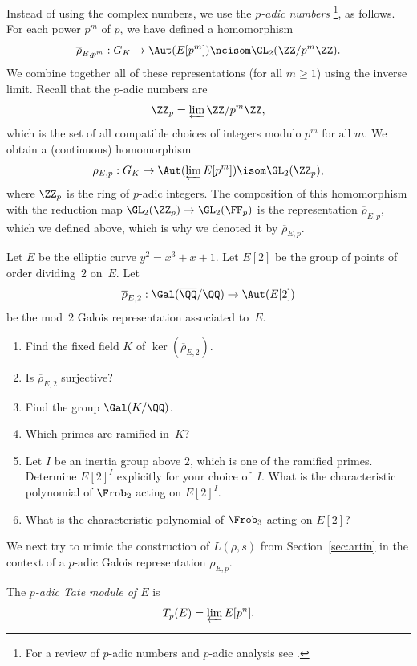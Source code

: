 Instead of using the complex numbers, we use the \emph{$p$-adic numbers}
\footnote{
  For a review of $p$-adic numbers and $p$-adic analysis
  see \cite{koblitz1996p}.
}, as follows. For each power $p^m$ of $p$, we have defined a homomorphism
\[
  \overline{\rho}_{E,p^m}: G_K \to \Aut(E[p^m]) \ncisom \GL_2(\ZZ/p^m\ZZ).
\]
We combine together all of these representations (for all $m\geq 1$)
using the inverse limit.
Recall that the $p$-adic numbers are
\[
  \ZZ_p = \varprojlim \ZZ/p^m\ZZ,
\]
which is the set of all compatible choices of integers modulo $p^m$ for
all $m$.
We obtain a (continuous) homomorphism
\[
  \rho_{E,p}: G_K \to \Aut(\varprojlim E[p^m]) \isom \GL_2(\ZZ_p),
\]
where $\ZZ_p$ is the ring of $p$-adic integers.  The composition of
this homomorphism with the reduction map $\GL_2(\ZZ_p) \to \GL_2(\FF_p)$
is the representation $\overline{\rho}_{E,p}$, which we defined above, which
is why we denoted it by $\overline{\rho}_{E,p}$.

\begin{exercise}
  Let $E$ be the elliptic curve $y^2=x^3+x+1$.  Let 
  $E[2]$  be the group of points of order dividing~$2$ on~$E$.  Let 
  \[
    \overline{\rho}_{E,2}:\Gal(\overline{\QQ}/\QQ) \to \Aut(E[2])
  \]
  be the mod~$2$ Galois representation associated to~$E$.
  \begin{enumerate}
    \item Find the fixed field $K$ of $\ker(\overline{\rho}_{E,2})$.
    \item Is $\overline{\rho}_{E,2}$ surjective?
    \item Find the group $\Gal(K/\QQ)$.
    \item Which primes are ramified in~$K$?
    \item Let $I$ be an inertia group above $2$, which is one of the ramified 
    primes. Determine $E[2]^I$ explicitly for your choice of~$I$. What is the
    characteristic polynomial of $\Frob_2$ acting on $E[2]^I$.
    \item What is the characteristic polynomial of $\Frob_3$ acting
    on $E[2]$?
  \end{enumerate}
\end{exercise}

We next try to mimic the construction of $L(\rho,s)$ from
Section~\ref{sec:artin} in the context of a $p$-adic Galois
representation $\rho_{E,p}$.

\begin{definition}
  The \emph{$p$-adic Tate module of $E$} is
  \[
    T_p(E) = \varprojlim E[p^n].
  \]
\end{definition}

